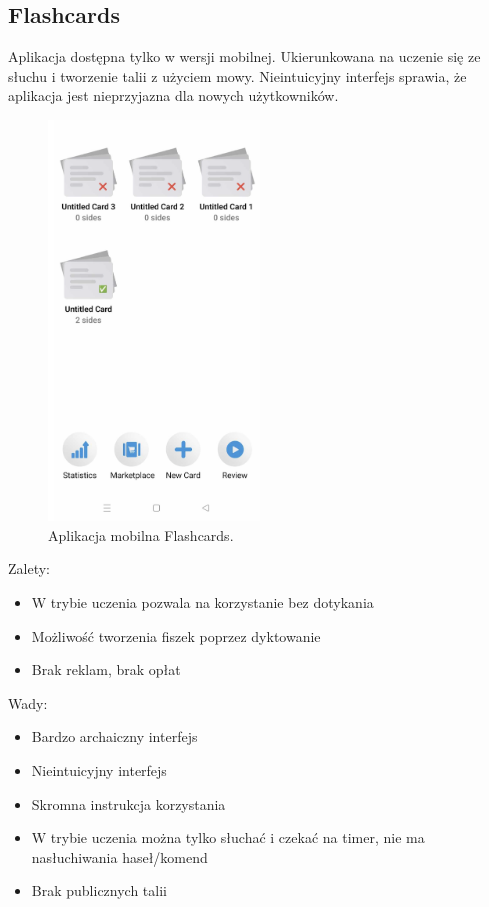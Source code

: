 \subsection{Flashcards}

Aplikacja dostępna tylko w wersji mobilnej. Ukierunkowana na uczenie się ze słuchu i tworzenie talii z użyciem mowy. Nieintuicyjny interfejs sprawia, że aplikacja jest nieprzyjazna dla nowych użytkowników.

\begin{figure}[H]
    \centering
    \includegraphics[width=0.5\textwidth]{chapters/chapter_3/flashcards.png}
    \caption{Aplikacja mobilna Flashcards.}
    \label{img:flashcards}
\end{figure}

Zalety:
\begin{itemize}[label=-]
    \item W trybie uczenia pozwala na korzystanie bez dotykania
    \item Możliwość tworzenia fiszek poprzez dyktowanie
    \item Brak reklam, brak opłat
\end{itemize}

Wady:
\begin{itemize}[label=-]
    \item Bardzo archaiczny interfejs
    \item Nieintuicyjny interfejs
    \item Skromna instrukcja korzystania
    \item W trybie uczenia można tylko słuchać i czekać na timer, nie ma nasłuchiwania haseł/komend
    \item Brak publicznych talii
\end{itemize}

